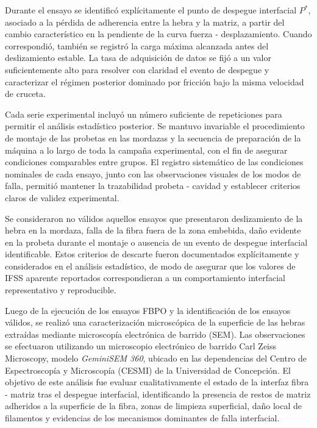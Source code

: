 Durante el ensayo se identificó explícitamente el punto de despegue interfacial \(P^{\ast}\),
asociado a la pérdida de adherencia entre la hebra y la matriz, a partir del cambio
característico en la pendiente de la curva fuerza - desplazamiento. Cuando correspondió, también
se registró la carga máxima alcanzada antes del deslizamiento estable. La tasa de adquisición
de datos se fijó a un valor suficientemente alto para resolver con claridad el evento de
despegue y caracterizar el régimen posterior dominado por fricción bajo la misma velocidad de
cruceta.

Cada serie experimental incluyó un número suficiente de repeticiones para permitir el análisis
estadístico posterior. Se mantuvo invariable el procedimiento de montaje de las probetas en las
mordazas y la secuencia de preparación de la máquina a lo largo de toda la campaña experimental,
con el fin de asegurar condiciones comparables entre grupos. El registro sistemático de las
condiciones nominales de cada ensayo, junto con las observaciones visuales de los modos de
falla, permitió mantener la trazabilidad probeta - cavidad y establecer criterios claros de
validez experimental.

Se consideraron no válidos aquellos ensayos que presentaron deslizamiento de la hebra en la
mordaza, falla de la fibra fuera de la zona embebida, daño evidente en la probeta durante el
montaje o ausencia de un evento de despegue interfacial identificable. Estos criterios de
descarte fueron documentados explícitamente y considerados en el análisis estadístico, de modo
de asegurar que los valores de IFSS aparente reportados correspondieran a un comportamiento
interfacial representativo y reproducible.

Luego de la ejecución de los ensayos FBPO y la identificación de los ensayos válidos, se realizó
una caracterización microscópica de la superficie de las hebras extraídas mediante microscopía
electrónica de barrido (SEM). Las observaciones se efectuaron utilizando un microscopio
electrónico de barrido Carl Zeiss Microscopy, modelo \textit{GeminiSEM 360}, ubicado en las
dependencias del Centro de Espectroscopía y Microscopía (CESMI) de la Universidad de Concepción.
El objetivo de este análisis fue evaluar cualitativamente el estado de la interfaz fibra - matriz
tras el despegue interfacial, identificando la presencia de restos de matriz adheridos a la
superficie de la fibra, zonas de limpieza superficial, daño local de filamentos y evidencias
de los mecanismos dominantes de falla interfacial.

